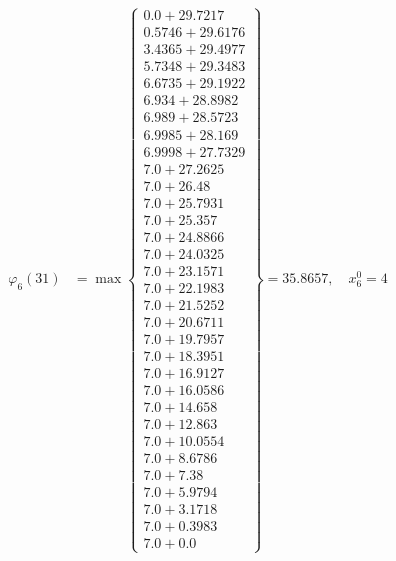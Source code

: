 \documentclass{article}
\begin{document}
\begin{align*}
  
\varphi_{6}(31) &= \max \left\{ \begin{array}{c}
0.0 + 29.7217 \\
 0.5746 + 29.6176 \\
 3.4365 + 29.4977 \\
 5.7348 + 29.3483 \\
 6.6735 + 29.1922 \\
 6.934 + 28.8982 \\
 6.989 + 28.5723 \\
 6.9985 + 28.169 \\
 6.9998 + 27.7329 \\
 7.0 + 27.2625 \\
 7.0 + 26.48 \\
 7.0 + 25.7931 \\
 7.0 + 25.357 \\
 7.0 + 24.8866 \\
 7.0 + 24.0325 \\
 7.0 + 23.1571 \\
 7.0 + 22.1983 \\
 7.0 + 21.5252 \\
 7.0 + 20.6711 \\
 7.0 + 19.7957 \\
 7.0 + 18.3951 \\
 7.0 + 16.9127 \\
 7.0 + 16.0586 \\
 7.0 + 14.658 \\
 7.0 + 12.863 \\
 7.0 + 10.0554 \\
 7.0 + 8.6786 \\
 7.0 + 7.38 \\
 7.0 + 5.9794 \\
 7.0 + 3.1718 \\
 7.0 + 0.3983 \\
 7.0 + 0.0
\end{array} \right\}=35.8657,\quad x_{6}^0=4\\
  
  
  

\end{align*}
\end{document}
